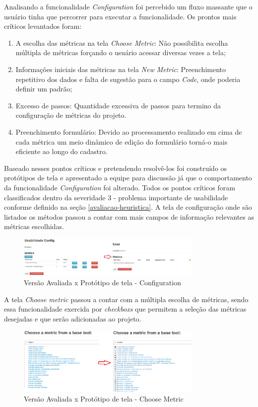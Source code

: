 Analisando a funcionalidade \textit{Configuration} foi percebido um fluxo massante que o usuário tinha que percorrer para executar a funcionalidade. Os prontos mais críticos levantados foram:

\begin{enumerate}
\item A escolha das métricas na tela \textit{Choose Metric}: Não possibilita escolha múltipla de métricas forçando o usuário acessar diversas vezes a tela;
\item Informações iniciais das métricas na tela \textit{New Metric}: Preenchimento repetitivo dos dados e falta de sugestão para o campo \textit{Code}, onde poderia definir um padrão;
\item Excesso de passos: Quantidade excessiva de passos para termino da configuração de métricas do projeto.
\item Preenchimento formulário: Devido ao processamento realizado em cima de cada métrica um meio dinâmico de edição do formulário torná-o mais eficiente ao longo do cadastro.
\end{enumerate}

Baseado nesses pontos críticos e pretendendo resolvê-los foi construído os protótipos de tela e apresentado a equipe para discussão já que o comportamento da funcionalidade \textit{Configuration} foi alterado. Todos os pontos críticos foram classificados dentro da severidade 3 - problema importante de usabilidade conforme definido na seção \ref{avaliacao-heuristica}. A tela de configuração onde são listados os métodos passou a contar com mais campos de informação relevantes as métricas escolhidas.

\graphicspath{{figuras/}}
\begin{figure}[h]
\centering
\includegraphics[width=0.8\textwidth]{PrototipoConfig}
\caption{Versão Avaliada x Protótipo de tela - Configuration}
\label{parallel-coordinate}
\end{figure}

A tela \textit{Choose metric} passou a contar com a múltipla escolha de métricas, sendo essa funcionalidade exercida por \textit{checkboxs} que permitem a seleção das métricas desejadas e que serão adicionadas ao projeto.

\graphicspath{{figuras/}}
\begin{figure}[h]
\centering
\includegraphics[width=0.8\textwidth]{PrototipoChooseMetric}
\caption{Versão Avaliada x Protótipo de tela - Choose Metric}
\label{parallel-coordinate}
\end{figure}

